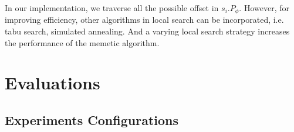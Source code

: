 \documentclass[10pt,journal]{IEEEtran}
\theoremstyle{remark}
\begin{document}
In our implementation,
 we traverse all the possible offset in $s_i.P_\phi$.
However,
 for improving efficiency,
 other algorithms in local search can be incorporated,
  i.e. tabu search, simulated annealing.
And a varying local search strategy increases the performance of the memetic algorithm.

\section{Evaluations \label{s:evalu}}

\subsection{Experiments Configurations}




\end{document}

